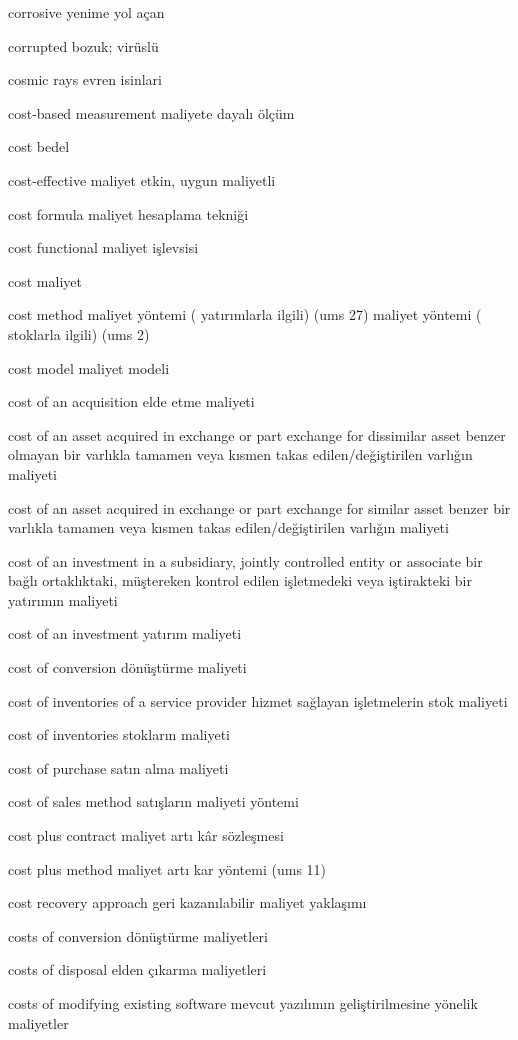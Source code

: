 \documentclass[12pt,fleqn]{article}\usepackage{../../common}
\begin{document}
corrosive yenime yol açan

corrupted bozuk; virüslü

cosmic rays evren isinlari

cost-based measurement maliyete dayalı ölçüm

cost bedel

cost-effective maliyet etkin, uygun maliyetli

cost formula maliyet hesaplama tekniği

cost functional maliyet işlevsisi

cost maliyet

cost method maliyet yöntemi ( yatırımlarla ilgili) (ums 27) maliyet yöntemi ( stoklarla ilgili) (ums 2)

cost model maliyet modeli

cost of an acquisition elde etme maliyeti

cost of an asset acquired in exchange or part exchange for dissimilar asset benzer olmayan bir varlıkla tamamen veya kısmen takas edilen/değiştirilen varlığın maliyeti

cost of an asset acquired in exchange or part exchange for similar asset benzer bir varlıkla tamamen veya kısmen takas edilen/değiştirilen varlığın maliyeti

cost of an investment in a subsidiary, jointly controlled entity or associate bir bağlı ortaklıktaki, müştereken kontrol edilen işletmedeki veya iştirakteki bir yatırımın maliyeti

cost of an investment yatırım maliyeti

cost of conversion dönüştürme maliyeti

cost of inventories of a service provider hizmet sağlayan işletmelerin stok maliyeti

cost of inventories stokların maliyeti

cost of purchase satın alma maliyeti

cost of sales method satışların maliyeti yöntemi

cost plus contract maliyet artı kâr sözleşmesi

cost plus method maliyet artı kar yöntemi (ums 11)

cost recovery approach geri kazanılabilir maliyet yaklaşımı

costs of conversion dönüştürme maliyetleri

costs of disposal elden çıkarma maliyetleri

costs of modifying existing software mevcut yazılımın geliştirilmesine yönelik maliyetler
\end{document}
